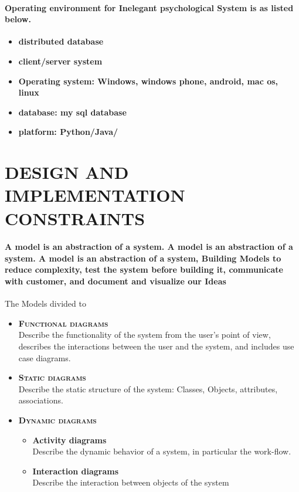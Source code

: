 \documentclass[../Psychological_system_web_application.tex]{subfiles}
\begin{document}
			\paragraph{Operating environment for Inelegant psychological System is as listed below.}
				\begin{itemize}
					\item
							\textbf{distributed \gls{database}}
					\item
							\textbf{client/server system}
					\item
							\textbf{Operating system: Windows, windows phone, android, mac os, linux}
					\item
							\textbf{database: my sql database}
					\item
							\textbf{platform: Python/Java/}
				\end{itemize}
		
		\section{DESIGN AND IMPLEMENTATION CONSTRAINTS}
			\paragraph{A model is an abstraction of a system. A model is an abstraction of a system. A model is an abstraction of a system, Building Models to reduce complexity, test the system before building it, communicate with customer, and document and visualize our Ideas}
			The Models divided to
			\begin{itemize}
				\item
					\textsc{\textbf{Functional diagrams}}\\
					Describe the functionality of the system from the user’s point of view, describes the interactions between the user and the system, and includes use case diagrams.

				\item
					\textsc{\textbf{Static diagrams}}\\
					Describe the static structure of the system: Classes, Objects, attributes, associations.
				\item
					\textsc{\textbf{Dynamic diagrams}}\\
						\begin{itemize}
							\item
								\textsf{\textbf{Activity diagrams}}\\
								Describe the dynamic behavior of a system, in particular the work-flow.							
							\item
								\textsf{\textbf{Interaction diagrams}}\\
								Describe the interaction between objects of the system
						\end{itemize}
			\end{itemize}
			
\end{document}
